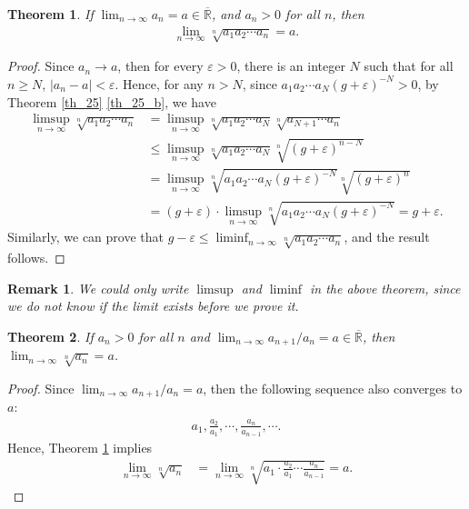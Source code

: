 \documentclass[10pt]{book}
\newtheorem{theorem}{Theorem}[chapter]
\newtheorem{remark}{Remark}[chapter]
\theoremstyle{definition}
\numberwithin{equation}{chapter}
\begin{document}
\medskip

\begin{theorem}\label{th_27}
If $\lim_{n\to\infty} a_n = a \in \overline{\mathbb{R}}$, and $a_n > 0$ for all $n$, then
\begin{align*}
    \lim_{n\to\infty} \sqrt[n]{a_1 a_2 \cdots a_n} = a.
\end{align*}
\end{theorem}
\begin{proof}
Since $a_n \to a$, then for every $\varepsilon > 0$, there is an integer $N$ such that for all $n \geq N$, $\left|a_n - a\right| < \varepsilon$. Hence, for any $n > N$, since $a_1 a_2 \cdots a_N (g+\varepsilon)^{-N} > 0$, by Theorem \ref{th_25} \ref{th_25_b}, we have
\begin{align*}
    \limsup_{n\to\infty} \sqrt[n]{a_1 a_2 \cdots a_n} & = \limsup_{n\to\infty} \sqrt[n]{a_1 a_2 \cdots a_N} \sqrt[n]{a_{N+1}\cdots a_n} \\
    & \leq \limsup_{n\to\infty} \sqrt[n]{a_1 a_2 \cdots a_N} \sqrt[n]{(g+\varepsilon)^{n-N}} \\
    & = \limsup_{n\to\infty} \sqrt[n]{a_1 a_2 \cdots a_N (g+\varepsilon)^{-N}} \sqrt[n]{(g+\varepsilon)^n} \\
    & = (g+\varepsilon) \cdot \limsup_{n\to\infty} \sqrt[n]{a_1 a_2 \cdots a_N (g+\varepsilon)^{-N}} = g+\varepsilon.
\end{align*}
Similarly, we can prove that $g - \varepsilon \leq \liminf_{n\to\infty} \sqrt[n]{a_1 a_2 \cdots a_n}$, and the result follows.
\end{proof}

\begin{remark}
We could only write $\limsup$ and $\liminf$ in the above theorem, since we do not know if the limit exists before we prove it. 
\end{remark}

\medskip

\begin{theorem}
If $a_n > 0$ for all $n$ and $\lim_{n\to\infty} a_{n+1}/a_n = a \in \overline{\mathbb{R}}$, then $\lim_{n\to\infty} \sqrt[n]{a_n} = a$.
\end{theorem}
\begin{proof}
Since $\lim_{n\to\infty} a_{n+1}/a_n = a$, then the following sequence also converges to $a$:
\begin{align*}
    a_1, \frac{a_2}{a_1}, \cdots, \frac{a_n}{a_{n-1}}, \cdots.
\end{align*}
Hence, Theorem \ref{th_27} implies
\begin{align*}
    \lim_{n\to\infty} \sqrt[n]{a_n} & = \lim_{n\to\infty} \sqrt[n]{a_1 \cdot \frac{a_2}{a_1} \cdots \frac{a_n}{a_{n-1}}} = a.
\end{align*}
\end{proof}
\end{document}
